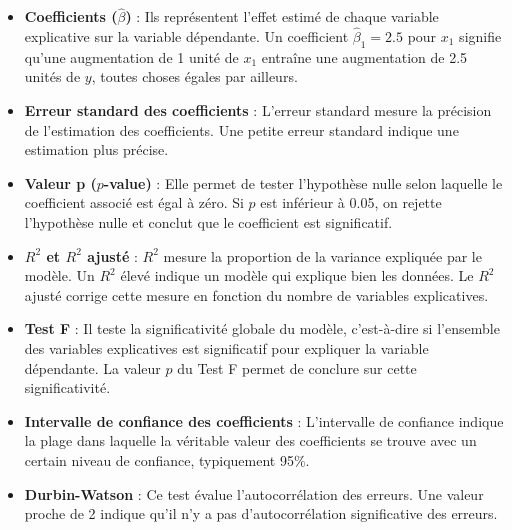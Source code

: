 \documentclass[a4paper,12pt]{article}
\begin{document}
	\begin{itemize}
		\item \textbf{Coefficients (\( \hat{\beta} \))} : Ils représentent l'effet estimé de chaque variable explicative sur la variable dépendante. Un coefficient \( \hat{\beta}_1 = 2.5 \) pour \( x_1 \) signifie qu'une augmentation de 1 unité de \( x_1 \) entraîne une augmentation de 2.5 unités de \( y \), toutes choses égales par ailleurs.
		
		\item \textbf{Erreur standard des coefficients} : L'erreur standard mesure la précision de l'estimation des coefficients. Une petite erreur standard indique une estimation plus précise.
		
		\item \textbf{Valeur p (\( p \)-value)} : Elle permet de tester l'hypothèse nulle selon laquelle le coefficient associé est égal à zéro. Si \( p \) est inférieur à 0.05, on rejette l'hypothèse nulle et conclut que le coefficient est significatif.
		
		\item \textbf{\( R^2 \) et \( R^2 \) ajusté} : \( R^2 \) mesure la proportion de la variance expliquée par le modèle. Un \( R^2 \) élevé indique un modèle qui explique bien les données. Le \( R^2 \) ajusté corrige cette mesure en fonction du nombre de variables explicatives.
		
		\item \textbf{Test F} : Il teste la significativité globale du modèle, c'est-à-dire si l'ensemble des variables explicatives est significatif pour expliquer la variable dépendante. La valeur \( p \) du Test F permet de conclure sur cette significativité.
		
		\item \textbf{Intervalle de confiance des coefficients} : L'intervalle de confiance indique la plage dans laquelle la véritable valeur des coefficients se trouve avec un certain niveau de confiance, typiquement 95\%.
		
		\item \textbf{Durbin-Watson} : Ce test évalue l'autocorrélation des erreurs. Une valeur proche de 2 indique qu'il n'y a pas d'autocorrélation significative des erreurs.
	\end{itemize}
	
	
\end{document}
